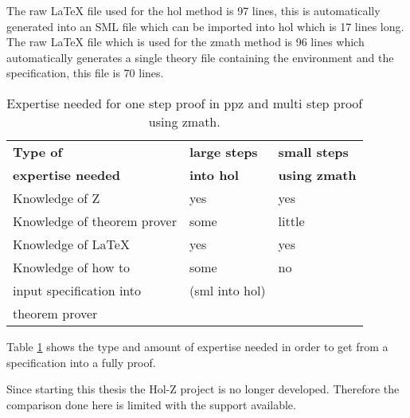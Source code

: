 The raw \LaTeX{} file used for the \gls{hol} method is 97 lines, this is
automatically generated into an SML file which can be imported into \gls{hol}
which is 17 lines long. The raw \LaTeX{} file which is used for the \gls{zmath}
method is 96 lines which automatically generates a single theory file containing
the environment and the specification, this file is 70 lines.

\begin{table}[H]
\begin{center}
\begin{tabular}{| l | l | l |}
\hline
\textbf{Type of} & \textbf{large steps} & \textbf{small steps} \\
\textbf{expertise needed} & \textbf{into \gls{hol}} & \textbf{using \gls{zmath}}
\\
\hline
\hline
Knowledge of Z &  yes & yes \\
\hline
Knowledge of theorem prover & some & little \\
\hline
Knowledge of \LaTeX & yes & yes \\
\hline
Knowledge of how to & some & no \\
input specification into &(sml into \gls{hol})&  \\
theorem prover &  &  \\
\hline
\end{tabular}
\end{center}
\caption{Expertise needed for one step proof in \gls{ppz} and multi step proof using \gls{zmath}.}
\label{tab:expertisebb}
\end{table}

Table \ref{tab:expertisebb} shows the type and amount of expertise needed in
order to get from a specification into a fully proof.

Since starting this thesis the Hol-Z project is no longer developed. Therefore the
comparison done here is limited with the support available.


